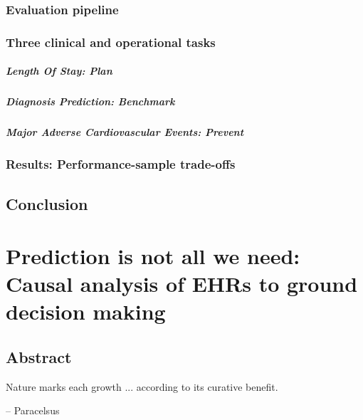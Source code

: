 \documentclass{report}
\begin{document}
\subsection{Evaluation pipeline}\label{subsec:predictive_models:evaluation_pipeline}

\subsection{Three clinical and operational tasks}\label{subsec:predictive_models:task_definitions}

\paragraph{Length Of Stay: Plan}

\paragraph{Diagnosis Prediction: Benchmark}

\paragraph{Major Adverse Cardiovascular Events: Prevent}

\subsection{Results: Performance-sample trade-offs}

\section{Conclusion}\label{sec:predictive_models:conclusion}

\chapter{Prediction is not all we need: Causal analysis of EHRs to ground decision making}\label{chapter:causal_tuto}
\section{Abstract}\label{sec:causal_tuto:abstract}

\begin{citationbox}
  Nature marks each growth ... according to its curative benefit.
  \par\hfill -- Paracelsus
\end{citationbox}
\end{document}
